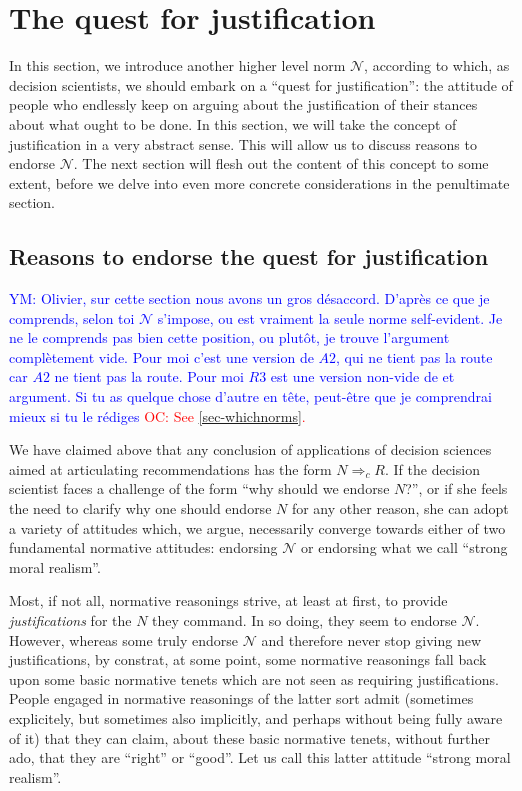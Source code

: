 \documentclass[preprint, french, english, 11pt, authoryear]{elsarticle}%
\newcommand{\commentYM}[1]{\textcolor{blue}{YM: #1}}
\newcommand{\commentOC}[1]{\textcolor{red}{OC: #1}}
\newcommand{\adv}{\mathscr{N}}
\begin{document}
\section{The quest for justification}
\label{sec-quest}
In this section, we introduce another higher level norm $\adv$, according to which, as decision scientists, we should embark on a ``quest for justification'': the attitude of people who endlessly keep on arguing about the justification of their stances about what ought to be done. In this section, we will take the concept of justification in a very abstract sense. This will allow us to discuss reasons to endorse $\adv$. The next section will flesh out the content of this concept to some extent, before we delve into even more concrete considerations in the penultimate section.

\subsection{Reasons to endorse the quest for justification}

\commentYM{Olivier, sur cette section nous avons un gros désaccord. D'après ce que je comprends, selon toi $\adv$ s'impose, ou est vraiment la seule norme self-evident. Je ne le comprends pas bien cette position, ou plutôt, je trouve l'argument complètement vide. Pour moi c'est une version de $A2$, qui ne tient pas la route car $A2$ ne tient pas la route. Pour moi $R3$ est une version non-vide de et argument. Si tu as quelque chose d'autre en tête, peut-être que je comprendrai mieux si tu le rédiges}
\commentOC{See \cref{sec-whichnorms}.}

We have claimed above that any conclusion of applications of decision sciences aimed at articulating recommendations has the form $N ⇒_c R$. If the decision scientist faces a challenge of the form ``why should we endorse $N$?'', or if she feels the need to clarify why one should endorse $N$ for any other reason, she can adopt a variety of attitudes which, we argue, necessarily converge towards either of two fundamental normative attitudes: endorsing $\adv$ or endorsing what we call ``strong moral realism''.

Most, if not all, normative reasonings strive, at least at first, to provide \emph{justifications} for the $N$ they command. In so doing, they seem to endorse $\adv$. However, whereas some truly endorse $\adv$ and therefore never stop giving new justifications, by constrat, at some point, some normative reasonings fall back upon some basic normative tenets which are not seen as requiring justifications. People engaged in normative reasonings of the latter sort admit (sometimes explicitely, but sometimes also implicitly, and perhaps without being fully aware of it) that they can claim, about these basic normative tenets, without further ado, that they are ``right'' or ``good''. Let us call this latter attitude ``strong moral realism''.
\end{document}
